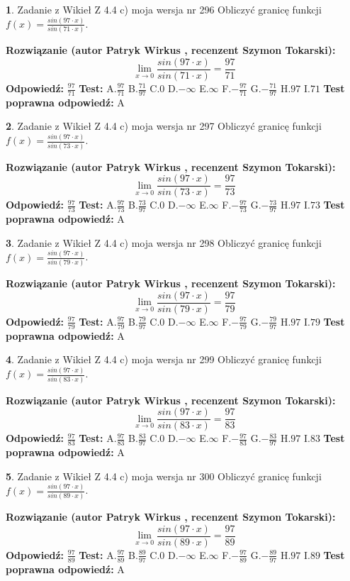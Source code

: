 \documentclass[12pt, a4paper]{article}
\theoremstyle{definition} %
\newtheorem{zad}{}
\newcommand{\zadStart}[1]{\begin{zad}#1\newline}
\newcommand{\zadStop}{\end{zad}}
\newcommand{\rozwStart}[2]{\noindent \textbf{Rozwiązanie (autor #1 , recenzent #2): }\newline}
\newcommand{\rozwStop}{\newline}
\newcommand{\odpStart}{\noindent \textbf{Odpowiedź:}\newline}
\newcommand{\odpStop}{\newline}
\newcommand{\testStart}{\noindent \textbf{Test:}\newline}
\newcommand{\testStop}{\newline}
\newcommand{\kluczStart}{\noindent \textbf{Test poprawna odpowiedź:}\newline}
\newcommand{\kluczStop}{\newline}
\begin{document}
\zadStart{Zadanie z Wikieł Z 4.4 c) moja wersja nr 296}
Obliczyć granicę funkcji $f(x)=\frac{sin(97\cdot x)}{sin(71\cdot x)}$.
\zadStop
\rozwStart{Patryk Wirkus}{Szymon Tokarski}
$$\lim\limits_{x\to 0}\frac{sin(97\cdot x)}{sin(71\cdot x)}=
\frac{97}{71}$$
\rozwStop
\odpStart
$\frac{97}{71}$
\odpStop
\testStart
A.$\frac{97}{71}$
B.$\frac{71}{97}$
C.$0$
D.$-\infty$
E.$\infty$
F.$-\frac{97}{71}$
G.$-\frac{71}{97}$
H.$97$
I.$71$
\testStop
\kluczStart
A
\kluczStop



\zadStart{Zadanie z Wikieł Z 4.4 c) moja wersja nr 297}
Obliczyć granicę funkcji $f(x)=\frac{sin(97\cdot x)}{sin(73\cdot x)}$.
\zadStop
\rozwStart{Patryk Wirkus}{Szymon Tokarski}
$$\lim\limits_{x\to 0}\frac{sin(97\cdot x)}{sin(73\cdot x)}=
\frac{97}{73}$$
\rozwStop
\odpStart
$\frac{97}{73}$
\odpStop
\testStart
A.$\frac{97}{73}$
B.$\frac{73}{97}$
C.$0$
D.$-\infty$
E.$\infty$
F.$-\frac{97}{73}$
G.$-\frac{73}{97}$
H.$97$
I.$73$
\testStop
\kluczStart
A
\kluczStop



\zadStart{Zadanie z Wikieł Z 4.4 c) moja wersja nr 298}
Obliczyć granicę funkcji $f(x)=\frac{sin(97\cdot x)}{sin(79\cdot x)}$.
\zadStop
\rozwStart{Patryk Wirkus}{Szymon Tokarski}
$$\lim\limits_{x\to 0}\frac{sin(97\cdot x)}{sin(79\cdot x)}=
\frac{97}{79}$$
\rozwStop
\odpStart
$\frac{97}{79}$
\odpStop
\testStart
A.$\frac{97}{79}$
B.$\frac{79}{97}$
C.$0$
D.$-\infty$
E.$\infty$
F.$-\frac{97}{79}$
G.$-\frac{79}{97}$
H.$97$
I.$79$
\testStop
\kluczStart
A
\kluczStop



\zadStart{Zadanie z Wikieł Z 4.4 c) moja wersja nr 299}
Obliczyć granicę funkcji $f(x)=\frac{sin(97\cdot x)}{sin(83\cdot x)}$.
\zadStop
\rozwStart{Patryk Wirkus}{Szymon Tokarski}
$$\lim\limits_{x\to 0}\frac{sin(97\cdot x)}{sin(83\cdot x)}=
\frac{97}{83}$$
\rozwStop
\odpStart
$\frac{97}{83}$
\odpStop
\testStart
A.$\frac{97}{83}$
B.$\frac{83}{97}$
C.$0$
D.$-\infty$
E.$\infty$
F.$-\frac{97}{83}$
G.$-\frac{83}{97}$
H.$97$
I.$83$
\testStop
\kluczStart
A
\kluczStop



\zadStart{Zadanie z Wikieł Z 4.4 c) moja wersja nr 300}
Obliczyć granicę funkcji $f(x)=\frac{sin(97\cdot x)}{sin(89\cdot x)}$.
\zadStop
\rozwStart{Patryk Wirkus}{Szymon Tokarski}
$$\lim\limits_{x\to 0}\frac{sin(97\cdot x)}{sin(89\cdot x)}=
\frac{97}{89}$$
\rozwStop
\odpStart
$\frac{97}{89}$
\odpStop
\testStart
A.$\frac{97}{89}$
B.$\frac{89}{97}$
C.$0$
D.$-\infty$
E.$\infty$
F.$-\frac{97}{89}$
G.$-\frac{89}{97}$
H.$97$
I.$89$
\testStop
\kluczStart
A
\kluczStop
\end{document}
